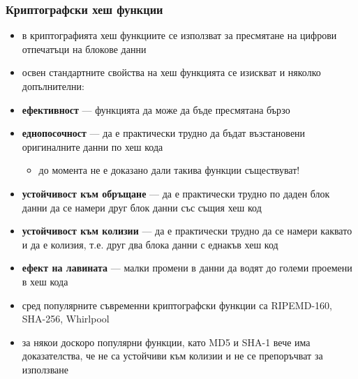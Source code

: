 \documentclass{beamer}
\begin{document}
\begin{frame}
  \frametitle{Криптографски хеш функции}
  \begin{itemize}[<+->]
  \item в криптографията хеш функциите се използват за пресмятане на
    цифрови отпечатъци на блокове данни
  \item освен стандартните свойства на хеш функцията се изискват и няколко допълнителни:
  \item \textbf{ефективност} ---  функцията да може да бъде пресмятана бързо
  \item \textbf{еднопосочност} ---  да е практически трудно да бъдат възстановени оригиналните данни по хеш кода
    \begin{itemize}
    \item \alert{до момента не е доказано дали такива функции съществуват!}
    \end{itemize}
  \item \textbf{устойчивост към обръщане} --- да е практически трудно по даден блок данни да се намери друг блок данни със същия хеш код
  \item \textbf{устойчивост към колизии} --- да е практически трудно да се намери каквато и да е колизия, т.е. друг два блока данни с еднакъв хеш код
  \item \textbf{ефект на лавината} --- малки промени в данни да водят до големи проемени в хеш кода
  \item сред популярните съвременни криптографски функции са RIPEMD-160, SHA-256, Whirlpool
  \item за някои доскоро популярни функции, като MD5 и SHA-1 вече има доказателства, че не са устойчиви към колизии и не се препоръчват за използване
  \end{itemize}
\end{frame}
\end{document}
